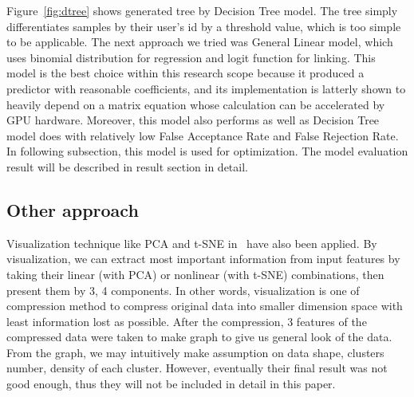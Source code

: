 \documentclass[English]{dicomopapers}
\begin{document}
Figure~\ref{fig:dtree} shows generated tree by Decision Tree model. The tree simply differentiates samples by their user's id by a threshold value, which is too simple to be applicable.\newline
	The next approach we tried was General Linear model, which uses binomial distribution for regression and logit function for linking. This model is the best choice within this research scope because it produced a predictor with reasonable coefficients, and its implementation is latterly shown to heavily depend on a matrix equation whose calculation can be accelerated by GPU hardware. Moreover, this model also performs as well as Decision Tree model does with relatively low False Acceptance Rate and False Rejection Rate. In following subsection, this model is used for optimization. The model evaluation result will be described in result section in detail.
\subsection{Other approach}
 Visualization technique like PCA and t-SNE in~\cite{maaten2008visualizing} have also been applied. By visualization, we can extract most important information from input features by taking their linear (with PCA) or nonlinear (with t-SNE) combinations, then present them by 3, 4 components. In other words, visualization is one of compression method to compress original data into smaller dimension space with least information lost as possible. After the compression, 3 features of the compressed data were taken to make graph to give us general look of the data. From the graph, we may intuitively make assumption on data shape, clusters number, density of each cluster. However, eventually their final result was not good enough, thus they will not be included in detail in this paper.
\end{document}
